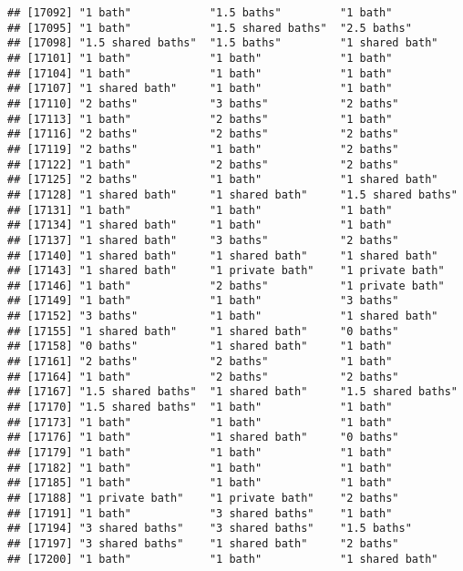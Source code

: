 \documentclass[
]{article}
\begin{document}
\begin{verbatim}
## [17092] "1 bath"            "1.5 baths"         "1 bath"           
## [17095] "1 bath"            "1.5 shared baths"  "2.5 baths"        
## [17098] "1.5 shared baths"  "1.5 baths"         "1 shared bath"    
## [17101] "1 bath"            "1 bath"            "1 bath"           
## [17104] "1 bath"            "1 bath"            "1 bath"           
## [17107] "1 shared bath"     "1 bath"            "1 bath"           
## [17110] "2 baths"           "3 baths"           "2 baths"          
## [17113] "1 bath"            "2 baths"           "1 bath"           
## [17116] "2 baths"           "2 baths"           "2 baths"          
## [17119] "2 baths"           "1 bath"            "2 baths"          
## [17122] "1 bath"            "2 baths"           "2 baths"          
## [17125] "2 baths"           "1 bath"            "1 shared bath"    
## [17128] "1 shared bath"     "1 shared bath"     "1.5 shared baths" 
## [17131] "1 bath"            "1 bath"            "1 bath"           
## [17134] "1 shared bath"     "1 bath"            "1 bath"           
## [17137] "1 shared bath"     "3 baths"           "2 baths"          
## [17140] "1 shared bath"     "1 shared bath"     "1 shared bath"    
## [17143] "1 shared bath"     "1 private bath"    "1 private bath"   
## [17146] "1 bath"            "2 baths"           "1 private bath"   
## [17149] "1 bath"            "1 bath"            "3 baths"          
## [17152] "3 baths"           "1 bath"            "1 shared bath"    
## [17155] "1 shared bath"     "1 shared bath"     "0 baths"          
## [17158] "0 baths"           "1 shared bath"     "1 bath"           
## [17161] "2 baths"           "2 baths"           "1 bath"           
## [17164] "1 bath"            "2 baths"           "2 baths"          
## [17167] "1.5 shared baths"  "1 shared bath"     "1.5 shared baths" 
## [17170] "1.5 shared baths"  "1 bath"            "1 bath"           
## [17173] "1 bath"            "1 bath"            "1 bath"           
## [17176] "1 bath"            "1 shared bath"     "0 baths"          
## [17179] "1 bath"            "1 bath"            "1 bath"           
## [17182] "1 bath"            "1 bath"            "1 bath"           
## [17185] "1 bath"            "1 bath"            "1 bath"           
## [17188] "1 private bath"    "1 private bath"    "2 baths"          
## [17191] "1 bath"            "3 shared baths"    "1 bath"           
## [17194] "3 shared baths"    "3 shared baths"    "1.5 baths"        
## [17197] "3 shared baths"    "1 shared bath"     "2 baths"          
## [17200] "1 bath"            "1 bath"            "1 shared bath"    

\end{verbatim}
\end{document}
